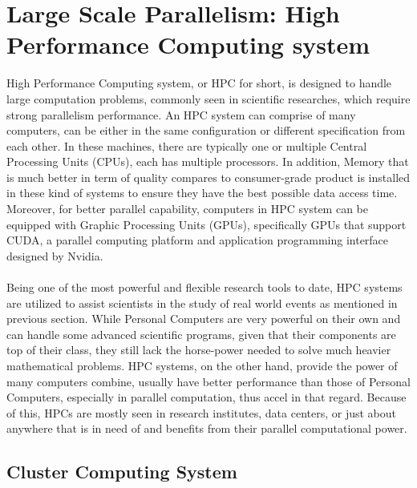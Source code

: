 \section{Large Scale Parallelism: High Performance Computing system}
High Performance Computing system, or HPC for short, is designed to handle large computation problems, commonly seen in scientific researches, which require strong parallelism performance. An HPC system can comprise of many computers, can be either in the same configuration or different specification from each other. In these machines, there are typically one or multiple Central Processing Units (CPUs), each has multiple processors. In addition, Memory that is much better in term of quality compares to consumer-grade product is installed in these kind of systems to ensure they have the best possible data access time. Moreover, for better parallel capability, computers in HPC system can be equipped with Graphic Processing Units (GPUs), specifically GPUs that support CUDA, a parallel computing platform and application programming interface designed by Nvidia. \\
~\\
Being one of the most powerful and flexible research tools to date, HPC systems are utilized to assist scientists in the study of real world events as mentioned in previous section. While Personal Computers are very powerful on their own and can handle some advanced scientific programs, given that their components are top of their class, they still lack the horse-power needed to solve much heavier mathematical problems. HPC systems, on the other hand, provide the power of many computers combine, usually have better performance than those of Personal Computers, especially in parallel computation, thus accel in that regard. Because of this, HPCs are mostly seen in research institutes, data centers, or just about anywhere that is in need of and benefits from their parallel computational power. \\

\subsection{Cluster Computing System}

